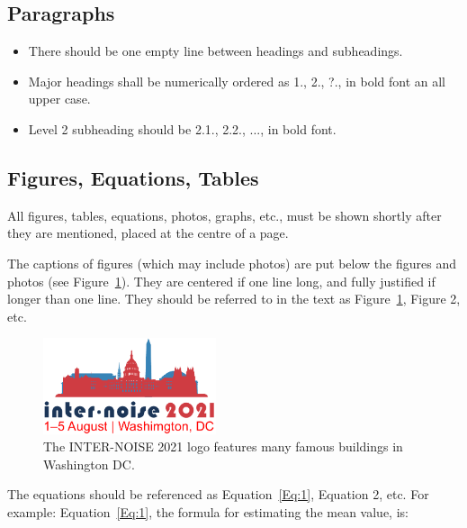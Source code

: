 \subsection{Paragraphs}

\begin{itemize}[noitemsep]
\item There should be one empty line between headings and subheadings.
\item Major headings shall be numerically ordered as 1., 2., ?., in bold font an all upper case.
\item Level 2 subheading should be 2.1., 2.2., ..., in bold font.
\end{itemize}

\subsection{Figures, Equations, Tables}

\noindent
All figures, tables, equations, photos, graphs, etc., must be shown shortly after they are mentioned, placed at the centre of a page. 

The captions of figures (which may include photos) are put below the figures and photos (see Figure~\ref{fig:1}).  They are centered if one line long, and fully justified if longer than one line.  They should be referred to in the text as Figure~\ref{fig:1}, Figure 2, etc. 

\begin{figure}[h!]
\begin{center}
  \includegraphics[width=2in,page=2]{internoise-2021.pdf}
  \end{center}
  \caption{The INTER-NOISE 2021 logo features many famous buildings in Washington DC.}
  \label{fig:1}
\end{figure}

The equations should be referenced as Equation~\ref{Eq:1}, Equation 2, etc. For example:  Equation~\ref{Eq:1}, the formula for estimating the mean value, is:

